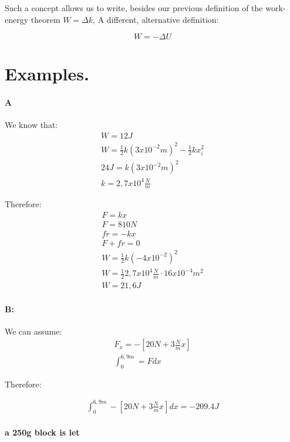\documentclass[11pt,fleqn]{book} %
\begin{document}
Such a concept allows us to write, besides our previous definition of the work-energy theorem $W = \Delta k$, A
different, alternative definition:

\begin{equation}
    W = - \Delta U
\end{equation}



\section{Examples.}

\paragraph{A}

We know that:
\begin{gather}
    W = 12J\\
    W = \frac{1}{2} k (3 x 10^{-2}m)^2 - \frac{1}{2} k x_i^2\\
    24J = k(3 x 10^{-2}m)^2\\
    k = 2,7 x 10^4 \frac{N}{m}
\end{gather}

Therefore:
\begin{gather}
    F = kx\\
    F = 810 N\\
    fr = -kx\\
    F + fr = 0\\
    W = \frac{1}{2} k (-4 x 10^{-2})^2\\
    W = \frac{1}{2} 2,7 x 10^4 \frac{N}{m} \cdot 16 x 10^{-4} m^2\\
    W = 21,6 J 
\end{gather}

\paragraph{B:}

We can assume:
\begin{gather}
    F_x = -[20N + 3 \frac{N}{m} x]\\
    \int_0^{6,9m} = F dx
\end{gather}

Therefore:

\begin{gather}
    \int_0^{6,9m} -[20N + 3 \frac{N}{m} x] dx = -209.4 J
\end{gather}

\paragraph*{a 250g block is let }
\end{document}
